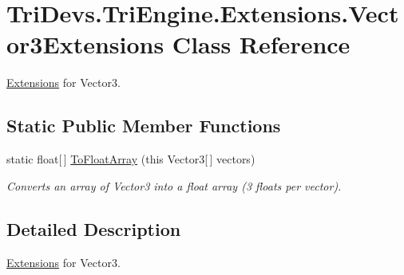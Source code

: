 \hypertarget{class_tri_devs_1_1_tri_engine_1_1_extensions_1_1_vector3_extensions}{\section{Tri\-Devs.\-Tri\-Engine.\-Extensions.\-Vector3\-Extensions Class Reference}
\label{class_tri_devs_1_1_tri_engine_1_1_extensions_1_1_vector3_extensions}
}


\hyperlink{namespace_tri_devs_1_1_tri_engine_1_1_extensions}{Extensions} for Vector3.  


\subsection*{Static Public Member Functions}
\begin{DoxyCompactItemize}
\item 
static float\mbox{[}$\,$\mbox{]} \hyperlink{class_tri_devs_1_1_tri_engine_1_1_extensions_1_1_vector3_extensions_a7776099ffe75352e4604658a36815188}{To\-Float\-Array} (this Vector3\mbox{[}$\,$\mbox{]} vectors)
\begin{DoxyCompactList}\small\item\em Converts an array of Vector3 into a float array (3 floats per vector). \end{DoxyCompactList}\end{DoxyCompactItemize}


\subsection{Detailed Description}
\hyperlink{namespace_tri_devs_1_1_tri_engine_1_1_extensions}{Extensions} for Vector3. 



